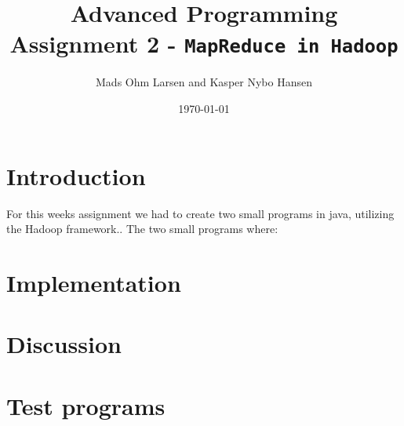 \documentclass[10pt, a4paper]{article}
\title{Advanced Programming \\\small{Assignment 2} - \texttt{MapReduce in Hadoop}}
\author{Mads Ohm Larsen and Kasper Nybo Hansen}
\date{\today}
\begin{document}
	
\maketitle
\section{Introduction}
For this weeks assignment we had to create two small programs in java, utilizing the Hadoop framework..
The two small programs where:

\section{Implementation}

\section{Discussion}

\section{Test programs}
\end{document}
